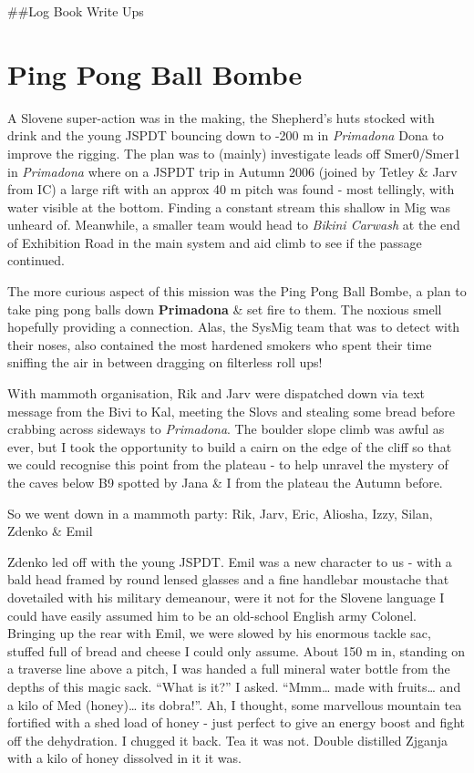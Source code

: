 
\#\#Log Book Write Ups

\hypertarget{ping-pong-ball-bombe}{%
\section{Ping Pong Ball Bombe}\label{ping-pong-ball-bombe}}

A Slovene super-action was in the making, the Shepherd's huts stocked
with drink and the young JSPDT bouncing down to -200 m in
\emph{Primadona} Dona to improve the rigging. The plan was to (mainly)
investigate leads off Smer0/Smer1 in \emph{Primadona} where on a JSPDT
trip in Autumn 2006 (joined by Tetley \& Jarv from IC) a large rift with
an approx 40 m pitch was found - most tellingly, with water visible at
the bottom. Finding a constant stream this shallow in Mig was unheard
of. Meanwhile, a smaller team would head to \emph{Bikini Carwash} at the
end of Exhibition Road in the main system and aid climb to see if the
passage continued.

The more curious aspect of this mission was the Ping Pong Ball Bombe, a
plan to take ping pong balls down \textbf{Primadona} \& set fire to
them. The noxious smell hopefully providing a connection. Alas, the
SysMig team that was to detect with their noses, also contained the most
hardened smokers who spent their time sniffing the air in between
dragging on filterless roll ups!

With mammoth organisation, Rik and Jarv were dispatched down via text
message from the Bivi to Kal, meeting the Slovs and stealing some bread
before crabbing across sideways to \emph{Primadona}. The boulder slope
climb was awful as ever, but I took the opportunity to build a cairn on
the edge of the cliff so that we could recognise this point from the
plateau - to help unravel the mystery of the caves below B9 spotted by
Jana \& I from the plateau the Autumn before.

So we went down in a mammoth party: Rik, Jarv, Eric, Aliosha, Izzy,
Silan, Zdenko \& Emil

Zdenko led off with the young JSPDT. Emil was a new character to us -
with a bald head framed by round lensed glasses and a fine handlebar
moustache that dovetailed with his military demeanour, were it not for
the Slovene language I could have easily assumed him to be an old-school
English army Colonel. Bringing up the rear with Emil, we were slowed by
his enormous tackle sac, stuffed full of bread and cheese I could only
assume. About 150 m in, standing on a traverse line above a pitch, I was
handed a full mineral water bottle from the depths of this magic sack.
``What is it?'' I asked. ``Mmm\ldots{} made with fruits\ldots{} and a
kilo of Med (honey)\ldots{} its dobra!''. Ah, I thought, some marvellous
mountain tea fortified with a shed load of honey - just perfect to give
an energy boost and fight off the dehydration. I chugged it back. Tea it
was not. Double distilled Zjganja with a kilo of honey dissolved in it
it was.

